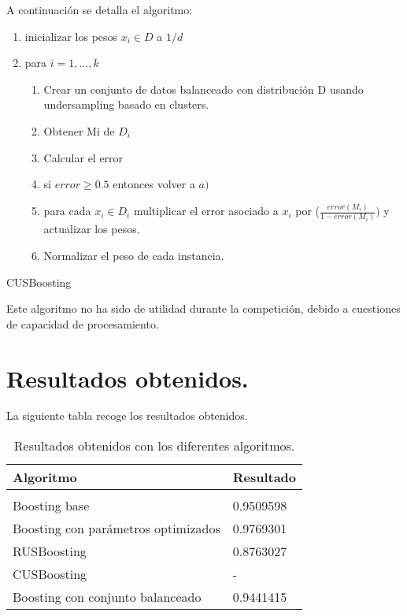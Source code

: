A continuación se detalla el algoritmo:

\begin{algorithm}[H]
	\begin{enumerate}
		\item inicializar los pesos $x_i \in D$ a $1/d$
		\item para $i=1,...,k$
		\begin{enumerate}
			\item Crear un conjunto de datos balanceado con distribución D usando
			undersampling basado en clusters.
			\item Obtener Mi de $D_i$
			\item Calcular el error 
			\item si $error\geq 0.5$ entonces volver a $a)$
			\item para cada $x_i\in D_i$ multiplicar el error asociado a $x_i$ por
			($\frac{error(M_i)}{1-error(M_i)})$ y actualizar los pesos.
			\item Normalizar el peso de cada instancia.  
		\end{enumerate}
	\end{enumerate}
	\caption{CUSBoosting}
\end{algorithm}

Este algoritmo no ha sido de utilidad durante la competición, debido a cuestiones de capacidad de procesamiento.


 
\section{Resultados obtenidos.}
La siguiente tabla recoge los resultados obtenidos.
\begin{table}[H]
	\centering
	\begin{tabular}{ll}
		\textbf{Algoritmo}& \textbf{Resultado} \\
		\hline
		\\
		Boosting base&    0.9509598  \\
		Boosting con parámetros optimizados& 0.9769301 \\
		RUSBoosting & 0.8763027 \\
		CUSBoosting &  -  \\
		Boosting con conjunto balanceado & 0.9441415  \\
	\end{tabular}
	\caption{Resultados obtenidos con los diferentes algoritmos.}
\end{table}
